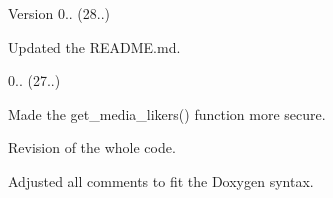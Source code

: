 \begin{DoxyVersion}{Version}
0.. (28..)
\begin{DoxyItemize}
\item Updated the R\+E\+A\+D\+M\+E.\+md. 
\end{DoxyItemize}

0.. (27..)
\begin{DoxyItemize}
\item Made the get\+\_\+media\+\_\+likers() function more secure.
\item Revision of the whole code.
\item Adjusted all comments to fit the Doxygen syntax. 
\end{DoxyItemize}
\end{DoxyVersion}
